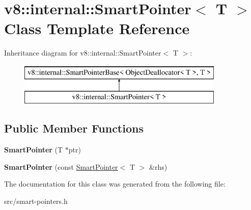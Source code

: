 \hypertarget{classv8_1_1internal_1_1_smart_pointer}{}\section{v8\+:\+:internal\+:\+:Smart\+Pointer$<$ T $>$ Class Template Reference}
\label{classv8_1_1internal_1_1_smart_pointer}
Inheritance diagram for v8\+:\+:internal\+:\+:Smart\+Pointer$<$ T $>$\+:\begin{figure}[H]
\begin{center}
\leavevmode
\includegraphics[height=2.000000cm]{classv8_1_1internal_1_1_smart_pointer}
\end{center}
\end{figure}
\subsection*{Public Member Functions}
\begin{DoxyCompactItemize}
\item 
\hypertarget{classv8_1_1internal_1_1_smart_pointer_a56dca3cc168abbe74520d7d245eac98e}{}{\bfseries Smart\+Pointer} (T $\ast$ptr)\label{classv8_1_1internal_1_1_smart_pointer_a56dca3cc168abbe74520d7d245eac98e}

\item 
\hypertarget{classv8_1_1internal_1_1_smart_pointer_a92c708fd65cfcec984c4022907aa613b}{}{\bfseries Smart\+Pointer} (const \hyperlink{classv8_1_1internal_1_1_smart_pointer}{Smart\+Pointer}$<$ T $>$ \&rhs)\label{classv8_1_1internal_1_1_smart_pointer_a92c708fd65cfcec984c4022907aa613b}

\end{DoxyCompactItemize}


The documentation for this class was generated from the following file\+:\begin{DoxyCompactItemize}
\item 
src/smart-\/pointers.\+h\end{DoxyCompactItemize}
